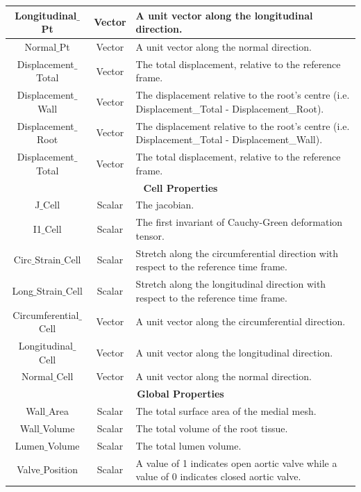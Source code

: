 \documentclass{article}
\begin{document}
\begin{tabular}{|c|c|p{9.4cm}|}
	\hline
Longitudinal$\_$Pt	&Vector & A unit vector along the longitudinal direction.\\
	\hline
Normal$\_$Pt	&Vector & A unit vector along the normal direction.\\
\hline
Displacement$\_$Total & Vector & The total displacement, relative to the reference frame. \\
	\hline
Displacement$\_$Wall & Vector & The displacement relative to the root's centre \newline (i.e. Displacement\_Total - Displacement\_Root). \\
	\hline
Displacement$\_$Root  &  Vector& The displacement relative to the root's centre \newline (i.e. Displacement\_Total - Displacement\_Wall).\\
	\hline
Displacement$\_$Total & Vector & The total displacement, relative to the reference frame. \\
\hline
\hline
\multicolumn{3}{|c|}{\textbf{Cell Properties}} \\
\hline
J$\_$Cell	& Scalar& The jacobian.\\
\hline
I1$\_$Cell& Scalar & The first invariant of Cauchy-Green deformation tensor. \\
\hline
Circ$\_$Strain$\_$Cell & Scalar & Stretch along the circumferential direction with respect to the reference time frame.\\
\hline
Long$\_$Strain$\_$Cell & Scalar & Stretch along the longitudinal direction with respect to the reference time frame. \\
	\hline
Circumferential$\_$Cell	&  Vector  & A unit vector along the circumferential direction.\\
	\hline
Longitudinal$\_$Cell 	&  Vector & A unit vector along the longitudinal direction.\\
	\hline
Normal$\_$Cell 	&  Vector & A unit vector along the normal direction.\\
\hline
\hline
\multicolumn{3}{|c|}{\textbf{Global  Properties}} \\
\hline
Wall$\_$Area	&Scalar &The total surface area of the medial mesh. \\
	\hline
	Wall$\_$Volume	&Scalar &The total volume of the root tissue. \\
	\hline
	Lumen$\_$Volume	&Scalar &The total lumen volume. \\	
	\hline
Valve$\_$Position	&Scalar & A value of 1 indicates open aortic valve while a value of 0 indicates closed aortic valve.\\
	\hline
\end{tabular}
\end{document}
